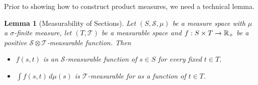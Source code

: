 \documentclass{amsart}
\newtheorem{lem}[thm]{Lemma}
\theoremstyle{remark}
\theoremstyle{definition}
\begin{document}
Prior to showing how to construct product measures, we need a
technical lemma.
\begin{lem}[Measurability of Sections]\label{MeasurableSections}Let $(S, \mathcal{S}, \mu)$ be a measure space with $\mu$ a
  $\sigma$-finite measure, let $(T, \mathcal{T})$ be a measurable
  space and $f : S \times T \to \mathbb{R}_+$ be a positive $\mathcal{S} \otimes \mathcal{T} $-measurable
  function.  Then
\begin{itemize}
\item[(i)]$f(s,t)$ is an $\mathcal{S}$-measurable function of $s \in
  S$ for every fixed $t \in T$.
\item[(ii)] $\int f(s,t) \,  d \mu(s)$ is $\mathcal{T}$-measurable for
  as a function of $t \in T$.
\end{itemize}
\end{lem}
\end{document}
